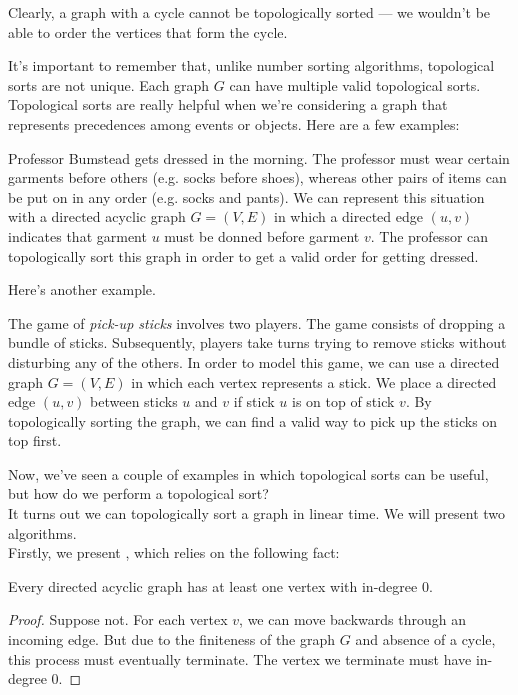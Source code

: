 Clearly, a graph with a cycle cannot be topologically sorted --- we wouldn't be able to order the vertices that form the cycle. 


It's important to remember that, unlike number sorting algorithms, topological sorts are not unique. Each graph $G$ can have multiple valid topological sorts. \\


Topological sorts are really helpful when we're considering a graph that represents precedences among events or objects. Here are a few examples:


\begin{example}
Professor Bumstead gets dressed in the morning. The professor must wear certain garments before others (e.g. socks before shoes), whereas other pairs of items can be put on in any order (e.g. socks and pants). We can represent this situation with a directed acyclic graph $G = (V, E)$ in which a directed edge $(u, v)$ indicates that garment $u$ must be donned before garment $v$. The professor can topologically sort this graph in order to get a valid order for getting dressed.
\end{example}

Here's another example.

\begin{example}
The game of \textit{pick-up sticks} involves two players. The game consists of dropping a bundle of sticks. Subsequently, players take turns trying to remove sticks without disturbing any of the others. In order to model this game, we can use a directed graph $G = (V, E)$ in which each vertex represents a stick. We place a directed edge $(u, v)$ between sticks $u$ and $v$ if stick $u$ is on top of stick $v$. By topologically sorting the graph, we can find a valid way to pick up the sticks on top first.
\end{example}

Now, we've seen a couple of examples in which topological sorts can be useful, but how do we perform a topological sort?  \\


It turns out we can topologically sort a graph in linear time. We will present two algorithms. \\


Firstly, we present , which relies on the following fact:


\begin{proposition}
Every directed acyclic graph has at least one vertex with in-degree $0$.
\end{proposition}
\begin{proof}
Suppose not. For each vertex $v$, we can move backwards through an incoming edge. But due to the finiteness of the graph $G$ and absence of a cycle, this process must eventually terminate. The vertex we terminate must have in-degree $0$.
\end{proof}

